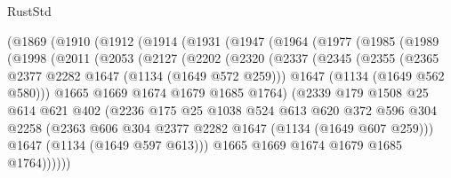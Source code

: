 \begin{lexlean}{RustStd}
\begin{coremodule}
    (@1869
      (@1910
        (@1912
          (@1914
            (@1931
              (@1947
                (@1964
                  (@1977
                    (@1985
                      (@1989
                        (@1998
                          (@2011
                            (@2053
                              (@2127
                                (@2202
                                  (@2320
                                    (@2337
                                      (@2345
                                        (@2355
                                          (@2365 @2377 @2282 @1647 (@1134 (@1649 @572 @259)))
                                          @1647
                                          (@1134 (@1649 @562 @580)))
                                        @1665
                                        @1669
                                        @1674
                                        @1679
                                        @1685
                                        @1764)
                                      (@2339
                                        @179
                                        @1508
                                        @25
                                        @614
                                        @621
                                        @402
                                        (@2236
                                          @175
                                          @25
                                          @1038
                                          @524
                                          @613
                                          @620
                                          @372
                                          @596
                                          @304
                                          @2258
                                          (@2363
                                            @606
                                            @304
                                            @2377
                                            @2282
                                            @1647
                                            (@1134 (@1649 @607 @259)))
                                          @1647
                                          (@1134 (@1649 @597 @613)))
                                        @1665
                                        @1669
                                        @1674
                                        @1679
                                        @1685
                                        @1764))))))

\end{coremodule}
\end{lexlean}
